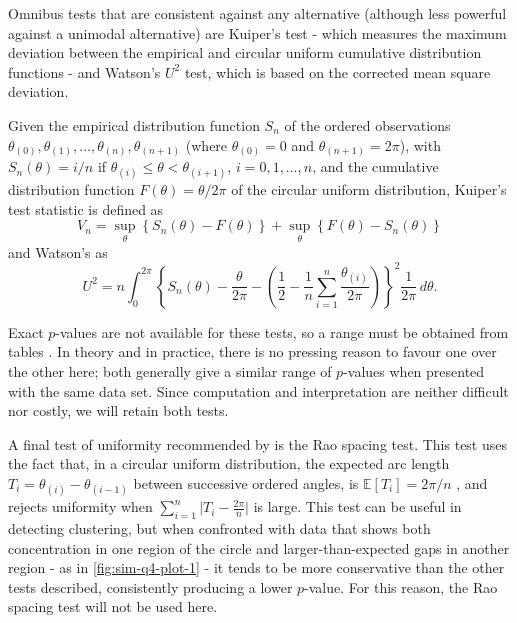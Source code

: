\documentclass[../../ArchStats.tex]{subfiles}
\begin{document}
Omnibus tests that are consistent against any alternative (although less powerful against a unimodal alternative) are Kuiper's test - which measures the maximum deviation between the empirical and circular uniform cumulative distribution functions - and Watson's $U^2$ test, which is based on the corrected mean square deviation. 

Given the empirical distribution function $S_n$ of the ordered observations $\theta_{(0)}, \theta_{(1)}, \dots, \theta_{(n)}, \theta_{(n+1)}$ (where $\theta_{(0)} = 0$ and $\theta_{(n+1)} = 2\pi$), with $S_n(\theta) = i/n$ if $\theta_{(i)} \leq \theta < \theta_{(i+1)}$, $i = 0,1,\dots, n$, and the cumulative distribution function $F(\theta) = \theta/2\pi$ of the circular uniform distribution, Kuiper's test statistic is defined as
\begin{equation}
V_n = \sup_\theta \left\lbrace S_n(\theta) - F(\theta) \right\rbrace + 
\sup_\theta \left\lbrace F(\theta) - S_n(\theta) \right\rbrace 
\end{equation}
and Watson's as
\begin{equation}
U^2 = n \int_0^{2\pi} \left\lbrace S_n(\theta) - \frac{\theta}{2\pi} - \left(\frac{1}{2} - \frac{1}{n} \sum_{i=1}^n \frac{\theta_{(i)}}{2\pi} \right) \right\rbrace^2 \frac{1}{2\pi}\, d\theta.
\end{equation}

Exact $p$-values are not available for these tests, so a range must be obtained from tables \cite{Mardia1999}. In theory and in practice, there is no pressing reason to favour one over the other here; both generally give a similar range of $p$-values when presented with the same data set. Since computation and interpretation are neither difficult nor costly, we will retain both tests.

A final test of uniformity recommended by \cite{Pewsey2014} is the Rao spacing test. This test uses the fact that, in a circular uniform distribution, the expected arc length $T_i = \theta_{(i)} - \theta_{(i-1)}$ between successive ordered angles, is 
$\mathbb{E}\left[T_i\right] = 2\pi/n$ , and rejects uniformity when $\sum_{i=1}^n \vert T_i - \frac{2\pi}{n}\vert$ is large. This test can be useful in detecting clustering, but when confronted with data that shows both concentration in one region of the circle and larger-than-expected gaps in another region - as in \ref{fig:sim-q4-plot-1} - it tends to be more conservative than the other tests described, consistently producing a lower $p$-value. For this reason, the Rao spacing test will not be used here.
\end{document}
